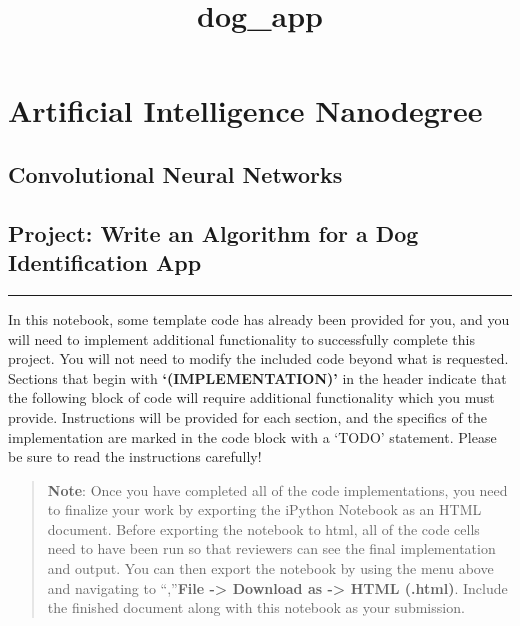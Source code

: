 \documentclass[11pt]{article}
\title{dog\_app}
\begin{document}
    
    
    \maketitle
    
    

    
    \hypertarget{artificial-intelligence-nanodegree}{%
\section{Artificial Intelligence
Nanodegree}\label{artificial-intelligence-nanodegree}}

\hypertarget{convolutional-neural-networks}{%
\subsection{Convolutional Neural
Networks}\label{convolutional-neural-networks}}

\hypertarget{project-write-an-algorithm-for-a-dog-identification-app}{%
\subsection{Project: Write an Algorithm for a Dog Identification
App}\label{project-write-an-algorithm-for-a-dog-identification-app}}

\begin{center}\rule{0.5\linewidth}{\linethickness}\end{center}

In this notebook, some template code has already been provided for you,
and you will need to implement additional functionality to successfully
complete this project. You will not need to modify the included code
beyond what is requested. Sections that begin with
\textbf{`(IMPLEMENTATION)'} in the header indicate that the following
block of code will require additional functionality which you must
provide. Instructions will be provided for each section, and the
specifics of the implementation are marked in the code block with a
`TODO' statement. Please be sure to read the instructions carefully!

\begin{quote}
\textbf{Note}: Once you have completed all of the code implementations,
you need to finalize your work by exporting the iPython Notebook as an
HTML document. Before exporting the notebook to html, all of the code
cells need to have been run so that reviewers can see the final
implementation and output. You can then export the notebook by using the
menu above and navigating to \n``,''\textbf{File -\textgreater{}
Download as -\textgreater{} HTML (.html)}. Include the finished document
along with this notebook as your submission.
\end{quote}
\end{document}
